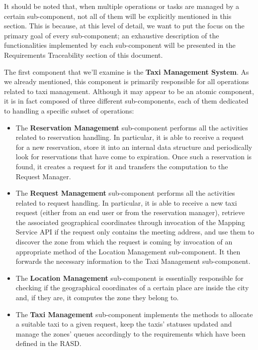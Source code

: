 It should be noted that, when multiple operations or tasks are managed by a certain sub-component, not all of them will be explicitly mentioned in this section. This is because, at this level of detail, we want to put the focus on the primary goal of every sub-component; an exhaustive description of the functionalities implemented by each sub-component will be presented in the Requirements Traceability section of this document. 

The first component that we'll examine is the \textbf{Taxi Management System}. As we already mentioned, this component is primarily responsible for all operations related to taxi management. Although it may appear to be an atomic component, it is in fact composed of three different sub-components, each of them dedicated to handling a specific subset of operations:
	\begin{itemize}
		\item The \textbf{Reservation Management} sub-component performs all the activities related to reservation handling. In particular, it is able to receive a request for a new reservation, store it into an internal data structure and periodically look for reservations that have come to expiration. Once such a reservation is found, it creates a request for it and transfers the computation to the Request Manager.
		\item The \textbf{Request Management} sub-component performs all the activities related to request handling. In particular, it is able to receive a new taxi request (either from an end user or from the reservation manager), retrieve the associated geographical coordinates through invocation of the Mapping Service API if the request only contains the meeting address, and use them to discover the zone from which the request is coming by invocation of an appropriate method of the Location Management sub-component. It then forwards the necessary information to the Taxi Management sub-component.
		\item The \textbf{Location Management} sub-component is essentially responsible for checking if the geographical coordinates of a certain place are inside the city and, if they are, it computes the zone they belong to. 
		\item The \textbf{Taxi Management} sub-component implements the methods to allocate a suitable taxi to a given request, keep the taxis' statuses updated and manage the zones' queues accordingly to the requirements which have been defined in the RASD.
	\end{itemize}
	
